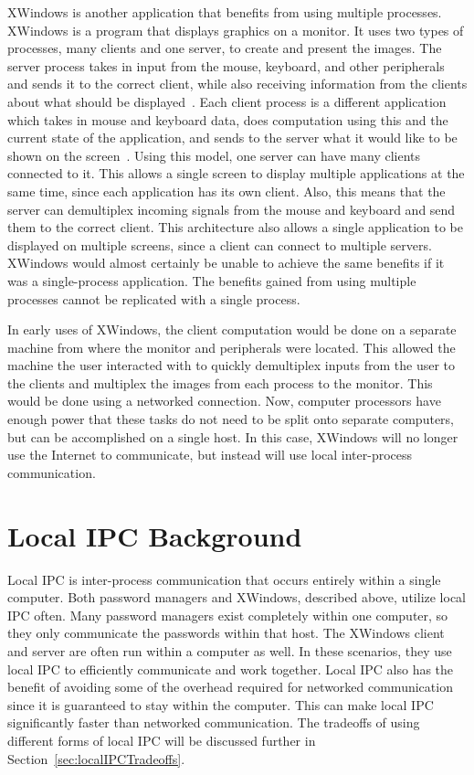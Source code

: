 XWindows is another application that benefits from using multiple processes.  XWindows is a program that displays graphics on a monitor.  It uses two types of processes, many clients and one server, to create and present the images.  The server process takes in input from the mouse, keyboard, and other peripherals and sends it to the correct client, while also receiving information from the clients about what should be displayed~\cite{Scheifler:1986:XWS:22949.24053}.  Each client process is a different application which takes in mouse and keyboard data, does computation using this and the current state of the application, and sends to the server what it would like to be shown on the screen~\cite{Scheifler:1986:XWS:22949.24053}.  Using this model, one server can have many clients connected to it.  This allows a single screen to display multiple applications at the same time, since each application has its own client.  Also, this means that the server can demultiplex incoming signals from the mouse and keyboard and send them to the correct client.  This architecture also allows a single application to be displayed on multiple screens, since a client can connect to multiple servers.  XWindows would almost certainly be unable to achieve the same benefits if it was a single-process application.  The benefits gained from using multiple processes cannot be replicated with a single process.

In early uses of XWindows, the client computation would be done on a separate machine from where the monitor and peripherals were located.  This allowed the machine the user interacted with to quickly demultiplex inputs from the user to the clients and multiplex the images from each process to the monitor.  This would be done using a networked connection.  Now, computer processors have enough power that these tasks do not need to be split onto separate computers, but can be accomplished on a single host.  In this case, XWindows will no longer use the Internet to communicate, but instead will use local inter-process communication.

\section{Local IPC Background}
\label{sec:localIPCBackground}
Local IPC is inter-process communication that occurs entirely within a single computer.  Both password managers and XWindows, described above, utilize local IPC often.  Many password managers exist completely within one computer, so they only communicate the passwords within that host.  The XWindows client and server are often run within a computer as well.  In these scenarios, they use local IPC to efficiently communicate and work together.  Local IPC also has the benefit of avoiding some of the overhead required for networked communication since it is guaranteed to stay within the computer.  This can make local IPC significantly faster than networked communication.  The tradeoffs of using different forms of local IPC will be discussed further in Section~\ref{sec:localIPCTradeoffs}.

